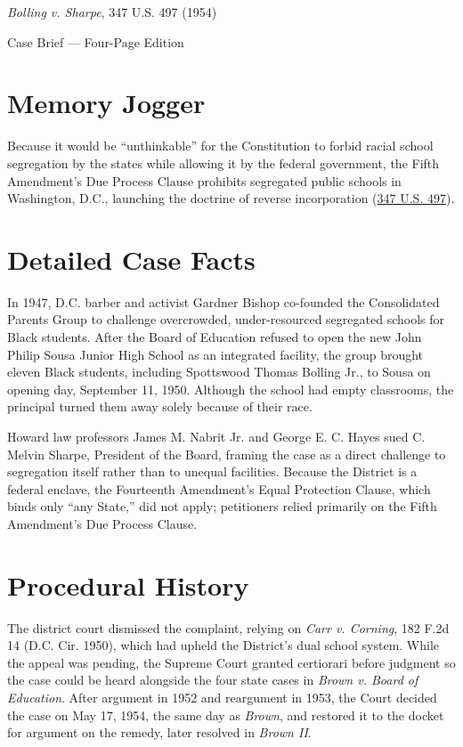 \documentclass[12pt]{article}
\begin{document}
\begin{center}
{\LARGE \textit{Bolling v. Sharpe}, 347 U.S. 497 (1954)\par}
\vspace{0.8em}
{\large Case Brief --- Four-Page Edition\par}
\end{center}
\vspace{1em}

\section{Memory Jogger}

Because it would be ``unthinkable'' for the Constitution to forbid racial school segregation by the states while allowing it by the federal government, the Fifth Amendment's Due Process Clause prohibits segregated public schools in Washington, D.C., launching the doctrine of reverse incorporation (\href{https://supreme.justia.com/cases/federal/us/347/497/}{347 U.S. 497}).

\section{Detailed Case Facts}

In 1947, D.C. barber and activist Gardner Bishop co-founded the Consolidated Parents Group to challenge overcrowded, under-resourced segregated schools for Black students. After the Board of Education refused to open the new John Philip Sousa Junior High School as an integrated facility, the group brought eleven Black students, including Spottswood Thomas Bolling Jr., to Sousa on opening day, September 11, 1950. Although the school had empty classrooms, the principal turned them away solely because of their race.

Howard law professors James M. Nabrit Jr. and George E. C. Hayes sued C. Melvin Sharpe, President of the Board, framing the case as a direct challenge to segregation itself rather than to unequal facilities. Because the District is a federal enclave, the Fourteenth Amendment's Equal Protection Clause, which binds only ``any State,'' did not apply; petitioners relied primarily on the Fifth Amendment's Due Process Clause.

\section{Procedural History}

The district court dismissed the complaint, relying on \textit{Carr v. Corning}, 182 F.2d 14 (D.C. Cir. 1950), which had upheld the District's dual school system. While the appeal was pending, the Supreme Court granted certiorari before judgment so the case could be heard alongside the four state cases in \textit{Brown v. Board of Education}. After argument in 1952 and reargument in 1953, the Court decided the case on May 17, 1954, the same day as \textit{Brown}, and restored it to the docket for argument on the remedy, later resolved in \textit{Brown II}.
\end{document}
